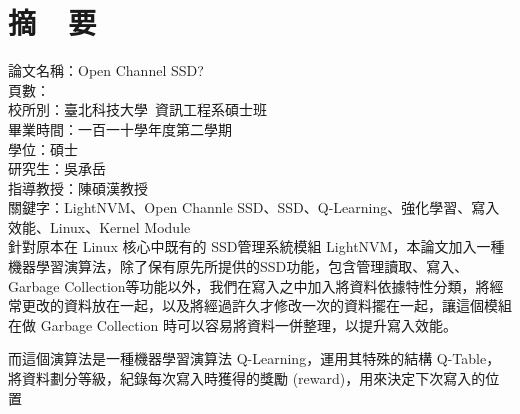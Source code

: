 \chapter*{摘~~要}


\noindent
論文名稱：Open Channel SSD? \\%
頁數：\\
校所別：臺北科技大學~資訊工程系碩士班\\
畢業時間：一百一十學年度第二學期\\
學位：碩士\\
研究生：吳承岳\\
指導教授：陳碩漢教授\\
\noindent
關鍵字：LightNVM、Open Channle SSD、SSD、Q-Learning、強化學習、寫入效能、Linux、Kernel Module\\
%
\indent
針對原本在 Linux 核心中既有的 SSD管理系統模組 LightNVM，本論文加入一種機器學習演算法，除了保有原先所提供的SSD功能，包含管理讀取、寫入、Garbage Collection等功能以外，我們在寫入之中加入將資料依據特性分類，將經常更改的資料放在一起，以及將經過許久才修改一次的資料擺在一起，讓這個模組在做 Garbage Collection 時可以容易將資料一併整理，以提升寫入效能。

\indent
而這個演算法是一種機器學習演算法 Q-Learning，運用其特殊的結構 Q-Table，將資料劃分等級，紀錄每次寫入時獲得的獎勵 (reward)，用來決定下次寫入的位置


%
